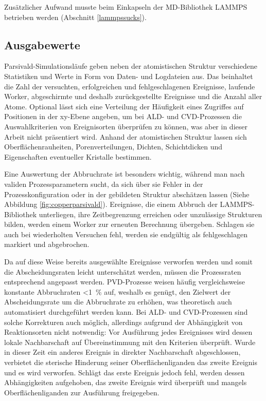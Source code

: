 Zusätzlicher Aufwand musste beim Einkapseln der MD-Bibliothek LAMMPS betrieben werden (Abschnitt \ref{lammpssucks}).

\subsection{Ausgabewerte}

Parsivald-Simulationsläufe geben neben der atomistischen Struktur verschiedene Statistiken und Werte in Form von Daten- und Logdateien aus.
Das beinhaltet die Zahl der versuchten, erfolgreichen und fehlgeschlagenen Ereignisse, laufende Worker, abgeschirmte und deshalb zurückgestellte Ereignisse und die Anzahl aller Atome.
Optional lässt sich eine Verteilung der Häufigkeit eines Zugriffes auf Positionen in der xy-Ebene angeben, um bei ALD- und CVD-Prozessen die Auswahlkriterien von Ereignisorten überprüfen zu können, was aber in dieser Arbeit nicht präsentiert wird.
Anhand der atomistischen Struktur lassen sich Oberflächenrauheiten, Porenverteilungen, Dichten, Schichtdicken und Eigenschaften eventueller Kristalle bestimmen.

Eine Auswertung der Abbruchrate ist besonders wichtig, während man nach validen Prozessparametern sucht, da sich über sie Fehler in der Prozesskonfiguration oder in der gebildeten Struktur abschätzen lassen (Siehe Abbildung \ref{fig:copperparsivald}).
Ereignisse, die einem Abbruch der LAMMPS-Bibliothek unterliegen, ihre Zeitbegrenzung erreichen oder unzulässige Strukturen bilden, werden einem Worker zur erneuten Berechnung übergeben.
Schlagen sie auch bei wiederholten Versuchen fehl, werden sie endgültig als fehlgeschlagen markiert und abgebrochen.

Da auf diese Weise bereits ausgewählte Ereignisse verworfen werden und somit die Abscheidungsraten leicht unterschätzt werden, müssen die Prozessraten entsprechend angepasst werden.
PVD-Prozesse weisen häufig vergleichsweise konstante Abbruchraten \SI{<1}{\percent} auf, weshalb es genügt, den Zielwert der Abscheidungsrate um die Abbruchrate zu erhöhen, was theoretisch auch automatisiert durchgeführt werden kann.
Bei ALD- und CVD-Prozessen sind solche Korrekturen auch möglich, allerdings aufgrund der Abhängigkeit von Reaktionsorten nicht notwendig:
Vor Ausführung jedes Ereignisses wird dessen lokale Nachbarschaft auf Übereinstimmung mit den Kriterien überprüft.
Wurde in dieser Zeit ein anderes Ereignis in direkter Nachbarschaft abgeschlossen, verbietet die sterische Hinderung seiner Oberflächenliganden das zweite Ereignis und es wird verworfen.
Schlägt das erste Ereignis jedoch fehl, werden dessen Abhängigkeiten aufgehoben, das zweite Ereignis wird überprüft und mangels Oberflächenliganden zur Ausführung freigegeben.


